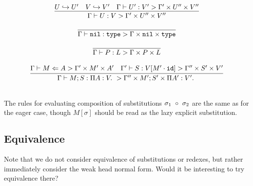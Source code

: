 $$
\begin{array}{c}
\infer{\LzFocus{U}{V}{\Gamma'}{U''}{V''}}{U\Weak U' & V\Weak V' & \LzFocus{U'}{V'}{\Gamma'}{U''}{V''}}\\\\
\infer{\LzFocus{\Nil}{\Type}{\Gamma}{\Nil}{\Type}}{} \\\\
\infer{\LzFocus{P}{L}{\Gamma}{P}{L}}{} \\\\
\infer{\LzFocus{M;S}{\PiTyp{A}{V}}{\Gamma''}{M';S'}{\PiTyp{A'}{V'}}}{\LzCheckTy{M}{A}{\Gamma'}{M'}{A'} & \LzFocus[\Gamma']{S}{V[M'\cdot\IdSub]}{\Gamma''}{S'}{V'}} \\\\
\end{array} 
$$

The rules for evaluating composition of substitutions $\sigma_1~\circ~\sigma_2$
are the same as for the eager case, though $M[\sigma]$ should be read
as the lazy explicit substitution.


\subsection{Equivalence} 

Note that we do not consider equivalence of substitutions or redexes, but rather
immediately consider the weak head normal form.  Would it be interesting
to try equivalence there?

\bigskip 
{}
\bigskip 

